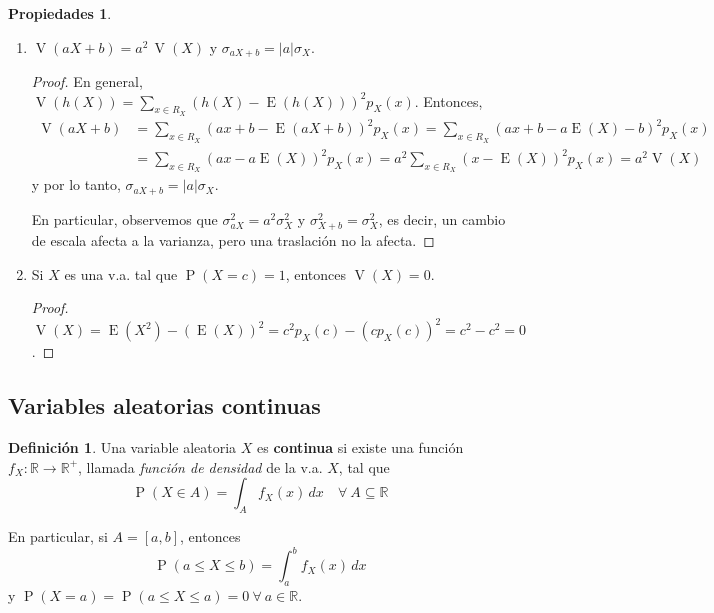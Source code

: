 \documentclass[11pt]{article}
\theoremstyle{plain}
\theoremstyle{definition}
\newtheorem*{defi}{Definición}
\newtheorem*{props}{Propiedades}
\theoremstyle{remark}
\newcommand{\deft}[1]{\textbf{#1}}  %
\newcommand{\proba}{\ensuremath{\operatorname{P}}}  %
\newcommand{\esp}[0]{\ensuremath{\operatorname{E}}}  %
\newcommand{\var}[0]{\ensuremath{\operatorname{V}}}  %
\newcommand{\foralle}{\ensuremath{\forall \ }}  %
\begin{document}
      \begin{props} \
        \begin{enumerate}
          \item $\var(aX + b) = a^2 \, \var(X)$ y $\sigma_{aX + b} = |a| \sigma_X$.
          \begin{proof}
            En general, $\var(h(X)) = \sum_{x \in R_X} (h(X) - \esp(h(X)))^2 p_X(x)$.
            Entonces,
            \[ \begin{split}
            \var(aX + b) &= \sum_{x \in R_X} (ax + b - \esp(aX + b))^2 p_X(x) = \sum_{x \in R_X} (ax + b - a \esp(X) - b)^2 p_X(x) \\
            &= \sum_{x \in R_X} (ax - a \esp(X))^2 p_X(x) = a^2 \sum_{x \in R_X} (x - \esp(X))^2 p_X(x) = a^2 \var(X)
            \end{split} \]
            y por lo tanto, $\sigma_{aX + b} = \vert a \vert \sigma_X$.

            En particular, observemos que $\sigma_{aX}^2 = a^2 \sigma_X^2$ y $\sigma_{X + b}^2 = \sigma_X^2$, es decir, un cambio de escala afecta a la varianza, pero una traslación no la afecta.
          \end{proof}

          \item Si $X$ es una v.a. tal que $\proba(X = c) = 1$, entonces $\var(X) = 0$.
          \begin{proof}
            $ \var(X) = \esp(X^2) - (\esp(X))^2 = c^2 p_X(c) - (c p_X(c))^2 = c^2 - c^2 = 0 $.
          \end{proof}
        \end{enumerate}
      \end{props}

  \subsection{Variables aleatorias continuas}

    \begin{defi}
      Una variable aleatoria $X$ es \deft{continua} si existe una función $f_X: \mathbb{R} \to \mathbb{R^+}$, llamada \emph{función de densidad} de la v.a. $X$, tal que
      \[ \proba(X \in A) = \int_A f_X(x) \,dx \quad \foralle A \subseteq \mathbb{R} \]
    \end{defi}

    En particular, si $A = [a,b]$, entonces
    \[ \proba(a \leq X \leq b) = \int_a^b f_X(x) \,dx \]
    y $\proba(X = a) = \proba(a \leq X \leq a) = 0 \ \foralle a \in \mathbb{R}$.
\end{document}
